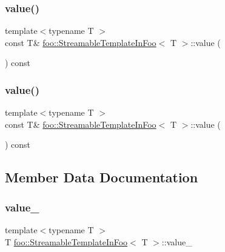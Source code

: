 \subsubsection{\texorpdfstring{value()}{value()}\hspace{0.1cm}{\footnotesize\ttfamily [2/3]}}
{\footnotesize\ttfamily template$<$typename T $>$ \\
const T\& \mbox{\hyperlink{classfoo_1_1_streamable_template_in_foo}{foo\+::\+Streamable\+Template\+In\+Foo}}$<$ T $>$\+::value (\begin{DoxyParamCaption}{ }\end{DoxyParamCaption}) const\hspace{0.3cm}{\ttfamily [inline]}}

\mbox{\label{classfoo_1_1_streamable_template_in_foo_aa6e29a9a298014ce74c65423b6985023}} 
\subsubsection{\texorpdfstring{value()}{value()}\hspace{0.1cm}{\footnotesize\ttfamily [3/3]}}
{\footnotesize\ttfamily template$<$typename T $>$ \\
const T\& \mbox{\hyperlink{classfoo_1_1_streamable_template_in_foo}{foo\+::\+Streamable\+Template\+In\+Foo}}$<$ T $>$\+::value (\begin{DoxyParamCaption}{ }\end{DoxyParamCaption}) const\hspace{0.3cm}{\ttfamily [inline]}}



\subsection{Member Data Documentation}
\mbox{\label{classfoo_1_1_streamable_template_in_foo_a6768ecbcc4e77edf9d5150b173d985c3}} 
\subsubsection{\texorpdfstring{value\_}{value\_}}
{\footnotesize\ttfamily template$<$typename T $>$ \\
T \mbox{\hyperlink{classfoo_1_1_streamable_template_in_foo}{foo\+::\+Streamable\+Template\+In\+Foo}}$<$ T $>$\+::value\+\_\+\hspace{0.3cm}{\ttfamily [private]}}



